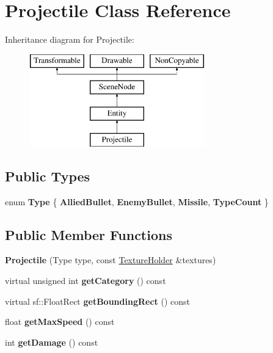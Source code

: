 \hypertarget{class_projectile}{}\section{Projectile Class Reference}
\label{class_projectile}
Inheritance diagram for Projectile\+:\begin{figure}[H]
\begin{center}
\leavevmode
\includegraphics[height=4.000000cm]{class_projectile}
\end{center}
\end{figure}
\subsection*{Public Types}
\begin{DoxyCompactItemize}
\item 
\hypertarget{class_projectile_ae0d6ce4b663618b4105d2f3a483ff2eb}{}enum {\bfseries Type} \{ {\bfseries Allied\+Bullet}, 
{\bfseries Enemy\+Bullet}, 
{\bfseries Missile}, 
{\bfseries Type\+Count}
 \}\label{class_projectile_ae0d6ce4b663618b4105d2f3a483ff2eb}

\end{DoxyCompactItemize}
\subsection*{Public Member Functions}
\begin{DoxyCompactItemize}
\item 
\hypertarget{class_projectile_a3cc3cae5a10d2ba896788e48d2decca8}{}{\bfseries Projectile} (Type type, const \hyperlink{class_resource_holder}{Texture\+Holder} \&textures)\label{class_projectile_a3cc3cae5a10d2ba896788e48d2decca8}

\item 
\hypertarget{class_projectile_ab85ee596545164953d19763d92c2f28c}{}virtual unsigned int {\bfseries get\+Category} () const \label{class_projectile_ab85ee596545164953d19763d92c2f28c}

\item 
\hypertarget{class_projectile_a314fb24ac002d5674f81a6857237f77e}{}virtual sf\+::\+Float\+Rect {\bfseries get\+Bounding\+Rect} () const \label{class_projectile_a314fb24ac002d5674f81a6857237f77e}

\item 
\hypertarget{class_projectile_a1af562c4a58c674243a1422bec2afe91}{}float {\bfseries get\+Max\+Speed} () const \label{class_projectile_a1af562c4a58c674243a1422bec2afe91}

\item 
\hypertarget{class_projectile_a583638375c8772c196b59c1be1667a29}{}int {\bfseries get\+Damage} () const \label{class_projectile_a583638375c8772c196b59c1be1667a29}

\end{DoxyCompactItemize}
